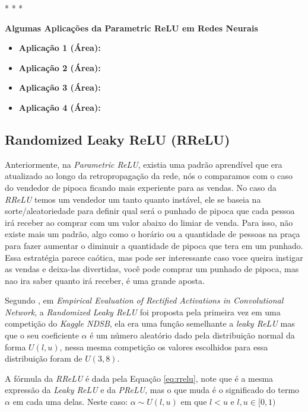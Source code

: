 \medskip
\begin{center}
 * * *
\end{center}
\medskip

\textbf{Algumas Aplicações da Parametric ReLU em Redes Neurais} 
\vspace{1em}

\begin{itemize}
    \item \textbf{Aplicação 1 (Área):}
    \item \textbf{Aplicação 2 (Área):}
    \item \textbf{Aplicação 3 (Área):}
    \item \textbf{Aplicação 4 (Área):}
\end{itemize}

\subsection{Randomized Leaky ReLU (RReLU)} 

Anteriormente, na \textit{Parametric ReLU}, existia uma padrão aprendível que era atualizado ao longo da retropropagação da rede, nós o comparamos com o caso do vendedor de pipoca ficando mais experiente para as vendas. No caso da \textit{RReLU} temos um vendedor um tanto quanto instável, ele se baseia na sorte/aleatoriedade para definir qual será o punhado de pipoca que cada pessoa irá receber ao comprar com um valor abaixo do limiar de venda. Para isso, não existe mais um padrão, algo como o horário ou a quantidade de pessoas na praça para fazer aumentar o diminuir a quantidade de pipoca que tera em um punhado. Essa estratégia parece caótica, mas pode ser interessante caso voce queira instigar as vendas e deixa-las divertidas, você pode comprar um punhado de pipoca, mas nao ira saber quanto irá receber, é uma grande aposta.

Segundo \textcite{XuRReLU}, em \textit{Empirical Evaluation of Rectified Activations in Convolutional Network}, a \textit{Randomized Leaky ReLU} foi proposta pela primeira vez em uma competição do \textit{Kaggle NDSB}, ela era uma função semelhante a \textit{leaky ReLU} mas que o seu coeficiente $\alpha$ é um número aleatório dado pela distribuição normal da forma $U(l, u)$, nessa mesma competição os valores escolhidos para essa distribuição foram de $U(3, 8)$.

A fórmula da \textit{RReLU} é dada pela Equação \ref{eq:rrelu}, note que é a mesma expressão da \textit{Leaky ReLU} e da \textit{PReLU}, mas o que muda é o significado do termo $\alpha$ em cada uma delas. Neste caso: $\alpha \sim U (l, u)$ em que $l < u$  e $l, u \in [0, 1)$ 

